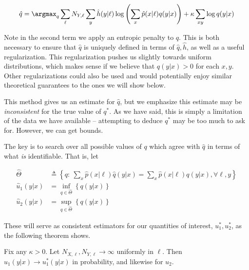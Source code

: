 \begin{equation}
\hat q = \argmax_q \sum_\ell N_{Y,\ell}\sum_{y}\hat h(y|\ell)\log\left(\sum_{x}\hat p(x|\ell)q(y|x)\right) + \kappa \sum_{xy} \log q(y|x)
\end{equation}

Note in the second term we apply an entropic penalty to $q$.  This is both necessary to ensure 
that $\hat q$ is uniquely defined in terms of $\hat q,\hat h$, as well as a useful regularization.
This regularization pushes us slightly towards uniform distributions, which makes sense if we believe that $q(y|x)>0$ 
for each $x,y$.  Other regularizations could also be used and would potentially
enjoy similar theoretical guarantees to the ones we will show below.

This method gives us an estimate for $\hat q$, but we emphasize this estimate may be \emph{inconsistent}
for the true value of $q^*$.  As we have said, this is simply a limitation of the data we have available -- attempting to deduce
$q^*$ may be too much to ask for.  However, we can get bounds.  

The key is to search over all possible values of $q$ which agree with $\hat q$ in terms of what \emph{is} identifiable.
That is, let 

\begin{align*}
\hat\Theta &\triangleq\left\{q:\ \sum_x \hat p(x|\ell)\hat q(y|x) =\sum_x \hat p(x|\ell)q(y|x), \forall \ell,y\right\}\\ 
\hat u_1(y|x) &= \inf_{q\in\hat\Theta} \left\{q(y|x) \right\} \\
\hat u_2(y|x) &= \sup_{q\in\hat\Theta} \left\{q(y|x) \right\}
\end{align*}

These will serve as consistent estimators for our quantities of interest, $u_1^*,u_2^*$, as the following theorem shows.\vspace{.1in}

\begin{thm}
Fix any $\kappa>0$.  Let $N_{X,\ell},N_{Y,\ell}\rightarrow\infty$ uniformly in $\ell$.  Then $\hat u_1(y|x)\rightarrow u^*_1(y|x)$ in probability, and likewise for $u_2$.
\end{thm}

